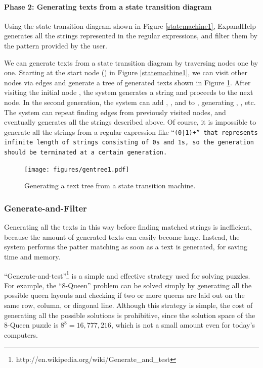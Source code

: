 \documentclass[manuscript,screen,review]{acmart}
\def\EH{\textsf{ExpandHelp}}
\begin{document}
\paragraph{Phase 2: Generating texts from a state transition diagram}

Using the state transition diagram shown in Figure \ref{statemachine1},
{\EH} generates all the strings represented in the regular expressions,
and filter them by the pattern provided by the user.

We can generate texts from a state transition diagram by traversing nodes one by one.
Starting at the start node
()
in Figure \ref{statemachine1},
we can visit other nodes via edges and generate a tree of generated texts
shown in Figure \ref{gentree1}.
After visiting the initial node
,
the system generates a string  and proceeds to the next node.
In the second generation,
the system can add , , and 
to , generating
, , etc.
The system can repeat finding edges from previously visited nodes,
and eventually generates all the strings described above.
Of course, it is impossible to generate all the strings
from a regular expression like ``\tt{(0|1)+}'' that represents infinite length of
strings consisting of \tt{0}s and \tt{1}s, so the generation should be
terminated at a certain generation.

\begin{figure}[htb]
\texttt{[image: figures/gentree1.pdf]}
\caption{Generating a text tree from a state transition machine.}
\label{gentree1}
\end{figure}

\subsubsection{Generate-and-Filter}

Generating all the texts in this way before finding matched strings is
inefficient, because the amount of generated texts can easily become huge.
Instead, the system performs the patter matching as soon as a text is generated,
for saving time and memory.

``Generate-and-test''\footnote{
  {\sf http:{\slash}{\slash}en.wikipedia.org{\slash}wiki{\slash}Generate\_and\_test}
}
is a simple and effective strategy used for solving puzzles.
For example,
the ``8-Queen'' problem can be solved simply by
generating all the possible queen layouts and checking if
two or more queens are laid out on the same row, column, or diagonal line.
Although this strategy is simple, the cost of
generating all the possible solutions is prohibitive, since
the solution space of the 8-Queen puzzle is $8^8 = 16,777,216$,
which is not a small amount even for today's computers.
\end{document}
